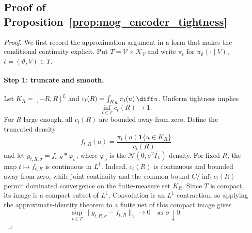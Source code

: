 \subsection{Proof of Proposition~\ref{prop:mog_encoder_tightness}}

\begin{proof}
We first record the approximation argument in a form that makes the
conditional continuity explicit.  Put
$T=\mathcal V\times\mathcal K_V$ and write $\pi_t$ for
$\pi_\vartheta(\cdot\mid V)$, $t=(\vartheta,V)\in T$.

\paragraph{Step 1: truncate and smooth.}
Let $K_R=[-R,R]^L$ and
$c_t(R)=\int_{K_R}\pi_t(u)\,\diff u$.  Uniform tightness implies
\begin{equation}
 \inf_{t\in T}c_t(R)\longrightarrow1.
 \label{eq:uniform_trunc_mass}
\end{equation}
For $R$ large enough, all $c_t(R)$ are bounded away from zero.  Define the
truncated density
\[
 f_{t,R}(u)=\frac{\pi_t(u)\mathbf 1\{u\in K_R\}}{c_t(R)}
\]
and let $g_{t,R,\sigma}=f_{t,R}*\varphi_\sigma$, where
$\varphi_\sigma$ is the $\mathcal N(0,\sigma^2I_L)$ density.  For fixed $R$,
the map $t\mapsto f_{t,R}$ is continuous in $L^1$.  Indeed, $c_t(R)$ is
continuous and bounded away from zero, while joint continuity and the common
bound $C/\inf_tc_t(R)$ permit dominated convergence on the finite-measure set
$K_R$.  Since $T$ is compact, its image is a compact subset of $L^1$.
Convolution is an $L^1$ contraction, so applying the approximate-identity
theorem to a finite net of this compact image gives
\begin{equation}
 \sup_{t\in T}\|g_{t,R,\sigma}-f_{t,R}\|_1\longrightarrow0
 \quad\text{as }\sigma\downarrow0.
 \label{eq:uniform_approx_identity}
\end{equation}


\end{proof}
